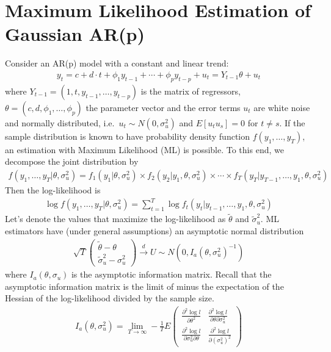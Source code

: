 \section[Maximum Likelihood Estimation of Gaussian AR{(p)}]{Maximum Likelihood Estimation of Gaussian AR{(p)}\label{ex:MaximumLikelihoodEstimationGaussianARp}}
Consider an AR{(p)} model with a constant and linear trend:
\begin{align*}
y_t = c + d\cdot t + \phi_1 y_{t-1} + \cdots + \phi_p y_{t-p} +u_{t}=Y_{t-1}\theta + u_t
\end{align*}
  where \(Y_{t-1}=(1,t, y_{t-1},\ldots,y_{t-p})\) is the matrix of regressors,
  \(\theta = (c,d,\phi_1,\ldots,\phi_p)\) the parameter vector
  and the error terms \(u_t\) are white noise and normally distributed, i.e.\
  \( u_t\sim N(0,\sigma_u^2) \) and \(E[u_t u_s]=0\) for \(t\neq s\).
If the sample distribution is known to have probability density function \(f(y_1,\ldots,y_T)\),
  an estimation with Maximum Likelihood (ML) is possible.
To this end, we decompose the joint distribution by
\begin{align*}
f(y_1,\ldots,y_T|\theta,\sigma_u^2)= f_1(y_1|\theta,\sigma_u^2) \times f_2(y_2|y_1,\theta,\sigma_u^2)\times \cdots \times f_T(y_T|y_{T-1},\ldots,y_1,\theta,\sigma_u^2)
\end{align*}
Then the log-likelihood is
\begin{align*}
\log f(y_1,\ldots,y_T|\theta,\sigma_u^2)=\sum_{t=1}^T \log f_t(y_t|y_{t-1},\ldots,y_1,\theta,\sigma_u^2)
\end{align*}
Let's denote the values that maximize the log-likelihood as \(\tilde{\theta}\) and \(\tilde{\sigma}_u^2\).
ML estimators have (under general assumptions) an asymptotic normal distribution
\begin{align*}
\sqrt{T}\begin{pmatrix}\tilde{\theta}-\theta \\ \tilde{\sigma}^2_u - \sigma_u^2 \end{pmatrix} \overset{d}{\rightarrow} U \sim N(0,I_a{(\theta,\sigma_u^2)}^{-1})
\end{align*}
where \(I_a(\theta,\sigma_u)\) is the asymptotic information matrix.
Recall that the asymptotic information matrix is the limit of minus the expectation of the Hessian of the log-likelihood divided by the sample size.
\begin{align*}
I_a(\theta,\sigma_u^2) = \lim\limits_{T\rightarrow \infty}-\frac{1}{T} E
\begin{pmatrix}
\frac{\partial^2 \log l}{\partial \theta^2} & \frac{\partial^2 \log l}{\partial \theta  \partial \sigma_u^2}
\\
\frac{\partial^2 \log l}{\partial \sigma_u^2  \partial \theta} & \frac{\partial^2 \log l}{\partial {(\sigma_u^2)}^2}  
\end{pmatrix}
\end{align*}

